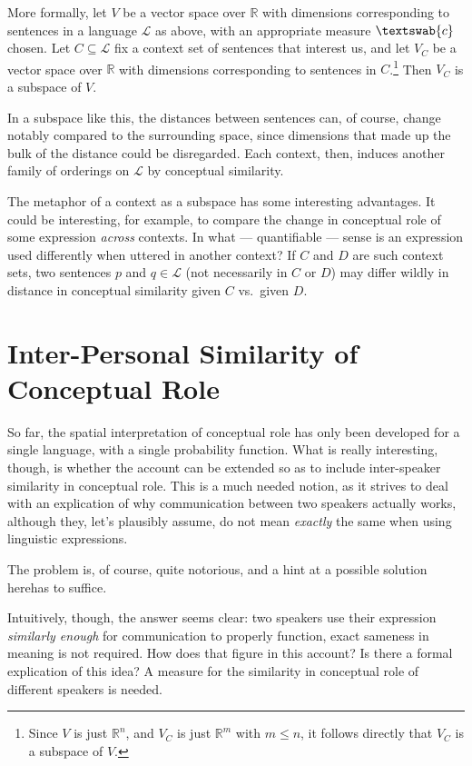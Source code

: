 \documentclass[11pt, a4paper]{scrartcl}
\renewcommand{\i}[1]{\emph{#1}}
\renewcommand{\L}{\mathcal{L}}
\newcommand{\m}[1]{\textswab{#1}}
\begin{document}
More formally, let $V$ be a vector space over $\mathbb{R}$ with dimensions corresponding to sentences in a language $\L$ as above, with an appropriate measure $\m{c}$ chosen. Let $C \subseteq \L$ fix a context set of sentences that interest us, and let $V_C$ be a vector space over $\mathbb{R}$ with dimensions corresponding to sentences in $C$.\footnote{Since $V$ is just $\mathbb{R}^n$, and $V_C$ is just $\mathbb{R}^m$ with $m \leqslant n$, it follows directly that $V_C$ is a subspace of $V$.} Then $V_C$ is a subspace of $V$.

In a subspace like this, the distances between sentences can, of course, change notably compared to the surrounding space, since dimensions that made up the bulk of the distance could be disregarded. Each context, then, induces another family of orderings on $\L$ by conceptual similarity.

The metaphor of a context as a subspace has some interesting advantages. It could be interesting, for example, to compare the change in conceptual role of some expression \i{across} contexts. In what --- quantifiable --- sense is an expression used differently when uttered in another context? If $C$ and $D$ are such context sets, two sentences $p$ and $q \in \L$  (not necessarily in $C$ or $D$) may differ wildly in distance in conceptual similarity given $C$ vs.\ given $D$. 

\section{Inter-Personal Similarity of Conceptual Role}

So far, the spatial interpretation of conceptual role has only been developed for a single language, with a single probability function. What is really interesting, though, is whether the account can be extended so as to include inter-speaker similarity in conceptual role. This is a much needed notion, as it strives to deal with an explication of why communication between two speakers actually works, although they, let's plausibly assume, do not mean \i{exactly} the same when using linguistic expressions. 

The problem is, of course, quite notorious, and a hint at a possible solution herehas to suffice.

Intuitively, though, the answer seems clear: two speakers use their expression \i{similarly enough} for communication to properly function, exact sameness in meaning is not required. How does that figure in this account? Is there a formal explication of this idea? A measure for the similarity in conceptual role of different speakers is needed. 
\end{document}
